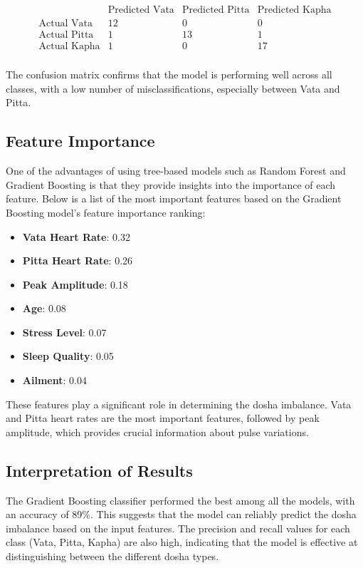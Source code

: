\documentclass[10pt,twocolumn]{article}
\begin{document}
\[
\begin{matrix}
  & \text{Predicted Vata} & \text{Predicted Pitta} & \text{Predicted Kapha} \\
\text{Actual Vata} & 12 & 0 & 0 \\
\text{Actual Pitta} & 1 & 13 & 1 \\
\text{Actual Kapha} & 1 & 0 & 17 \\
\end{matrix}
\]

The confusion matrix confirms that the model is performing well across all classes, with a low number of misclassifications, especially between Vata and Pitta.

\subsection{Feature Importance}
One of the advantages of using tree-based models such as Random Forest and Gradient Boosting is that they provide insights into the importance of each feature. Below is a list of the most important features based on the Gradient Boosting model's feature importance ranking:

\begin{itemize}
    \item \textbf{Vata Heart Rate}: 0.32
    \item \textbf{Pitta Heart Rate}: 0.26
    \item \textbf{Peak Amplitude}: 0.18
    \item \textbf{Age}: 0.08
    \item \textbf{Stress Level}: 0.07
    \item \textbf{Sleep Quality}: 0.05
    \item \textbf{Ailment}: 0.04
\end{itemize}

These features play a significant role in determining the dosha imbalance. Vata and Pitta heart rates are the most important features, followed by peak amplitude, which provides crucial information about pulse variations.
\subsection{Interpretation of Results}

The Gradient Boosting classifier performed the best among all the models, with an accuracy of 89\%. This suggests that the model can reliably predict the dosha imbalance based on the input features. The precision and recall values for each class (Vata, Pitta, Kapha) are also high, indicating that the model is effective at distinguishing between the different dosha types.
\end{document}
